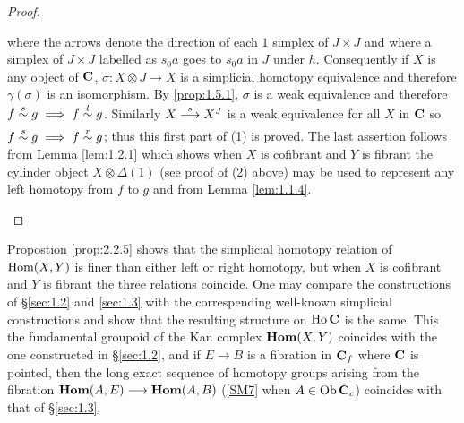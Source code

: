 \documentclass[../main]{subfiles}
\begin{document}
\begin{proof}
\begin{enumerate}
        where the arrows denote the direction of each $1$ simplex of $J\times J$ and where a simplex of $J\times J$ labelled as $s_0 a$ goes to $s_0a$ in $J$ under $h$. Consequently if $X$ is any object of $\mathbf{C}$, $\sigma:X\otimes J\longrightarrow X$ is a simplicial homotopy equivalence and therefore $\gamma(\sigma)$ is an isomorphism. By \ref{prop:1.5.1}, $\sigma$ is a weak equivalence and therefore $f\overset{s}{\sim} g\implies f\overset{l}{\sim} g$. Similarly $X\varrightarrow{s}X^J$ is a weak equivalence for all $X$ in $\mathbf{C}$ so $f\overset{s}{\sim}g\implies f\overset{r}{\sim} g$; thus this first part of (1) is proved. The last assertion follows from Lemma \ref{lem:1.2.1} which shows when $X$ is cofibrant and $Y$ is fibrant the cylinder object $X\otimes \Delta(1)$ (see proof of (2) above) may be used to represent any left homotopy from $f$ to $g$ and from Lemma \ref{lem:1.1.4}.
    \end{enumerate}
\end{proof}
\begin{remark*}
Propostion \ref{prop:2.2.5} shows that the simplicial homotopy relation of \\$\operatorname{Hom}(X,Y)$ is finer than either left or right homotopy, but when $X$ is cofibrant and $Y$ is fibrant the three relations coincide. One may compare the constructions of \S\ref{sec:1.2} and \ref{sec:1.3} with the correspending well-known simplicial constructions and show that the resulting structure on $\operatorname{Ho} \mathbf{C}$ is the same. This the fundamental groupoid of the Kan complex $\operatorname{\mathbf{Hom}}(X,Y)$ coincides with the one constructed in \S\ref{sec:1.2}, and if $E\longrightarrow B$ is a fibration in $\mathbf{C}_f$ where $\mathbf{C}$ is pointed, then the long exact sequence of homotopy groups arising from the fibration $\operatorname{\mathbf{Hom}}(A,E) \longrightarrow \operatorname{\mathbf{Hom}}(A,B)$ (\ref{SM7} when $A\in \operatorname{Ob}\mathbf{C}_c$) coincides with that of \S\ref{sec:1.3}.
\end{remark*}
\end{document}
